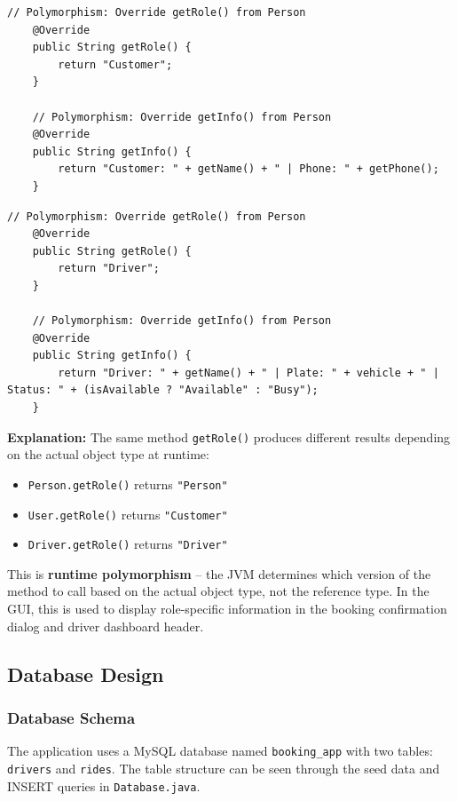 \documentclass[fonts]{icst}
\begin{document}
\begin{lstlisting}[caption={Polymorphism -- User overrides getRole() and getInfo()}]
    // Polymorphism: Override getRole() from Person
    @Override
    public String getRole() {
        return "Customer";
    }

    // Polymorphism: Override getInfo() from Person
    @Override
    public String getInfo() {
        return "Customer: " + getName() + " | Phone: " + getPhone();
    }
\end{lstlisting}

\begin{lstlisting}[caption={Polymorphism -- Driver overrides getRole() and getInfo()}]
    // Polymorphism: Override getRole() from Person
    @Override
    public String getRole() {
        return "Driver";
    }

    // Polymorphism: Override getInfo() from Person
    @Override
    public String getInfo() {
        return "Driver: " + getName() + " | Plate: " + vehicle + " | Status: " + (isAvailable ? "Available" : "Busy");
    }
\end{lstlisting}

\textbf{Explanation:} The same method \texttt{getRole()} produces different results depending on the actual object type at runtime:

\begin{itemize}
    \item \texttt{Person.getRole()} returns \texttt{"Person"}
    \item \texttt{User.getRole()} returns \texttt{"Customer"}
    \item \texttt{Driver.getRole()} returns \texttt{"Driver"}
\end{itemize}

This is \textbf{runtime polymorphism} -- the JVM determines which version of the method to call based on the actual object type, not the reference type. In the GUI, this is used to display role-specific information in the booking confirmation dialog and driver dashboard header.


\subsection{Database Design}

\subsubsection{Database Schema}

The application uses a MySQL database named \texttt{booking\_app} with two tables: \texttt{drivers} and \texttt{rides}. The table structure can be seen through the seed data and INSERT queries in \texttt{Database.java}.
\end{document}

